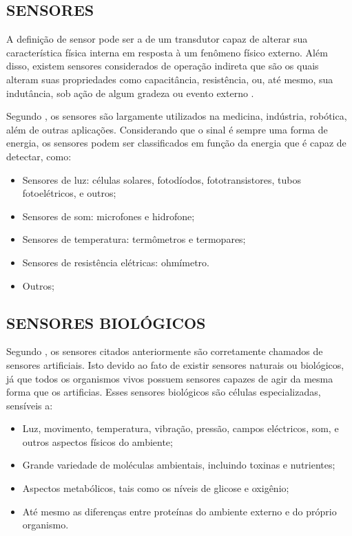 \subsection{SENSORES}
A definição de sensor pode ser a de um transdutor capaz de alterar sua característica física interna em resposta à um fenômeno físico externo. Além disso, existem sensores considerados de operação indireta que são os quais alteram suas propriedades como capacitância, resistência, ou, até mesmo, sua indutância, sob ação de algum gradeza ou evento externo \cite{rosario2006principios}. 

Segundo \cite{nomadusp2014}, os sensores são largamente utilizados na medicina, indústria, robótica, além de outras aplicações. Considerando que o sinal é sempre uma forma de energia, os sensores podem ser classificados em função da energia que é capaz de detectar, como:

\begin{itemize}
\item Sensores de luz: células solares, fotodíodos, fototransistores, tubos fotoelétricos, e outros;
\item Sensores de som: microfones e hidrofone;
\item Sensores de temperatura: termômetros e termopares;
\item Sensores de resistência elétricas: ohmímetro. 
\item Outros;
\end{itemize}

\subsection{SENSORES BIOLÓGICOS}
Segundo \cite{nomadusp2014}, os sensores citados anteriormente são corretamente chamados de sensores artificiais. Isto devido ao fato de existir sensores naturais ou biológicos, já que todos os organismos vivos possuem sensores capazes de agir da mesma forma que os artificias. Esses sensores biológicos são células especializadas, sensíveis a:

\begin{itemize}
\item Luz, movimento, temperatura, vibração, pressão, campos eléctricos, som, e outros aspectos físicos do ambiente;
\item Grande variedade de moléculas ambientais, incluindo toxinas e nutrientes;
\item Aspectos metabólicos, tais como os níveis de glicose e oxigênio;
\item Até mesmo as diferenças entre proteínas do ambiente externo e do próprio organismo.
\end{itemize}

